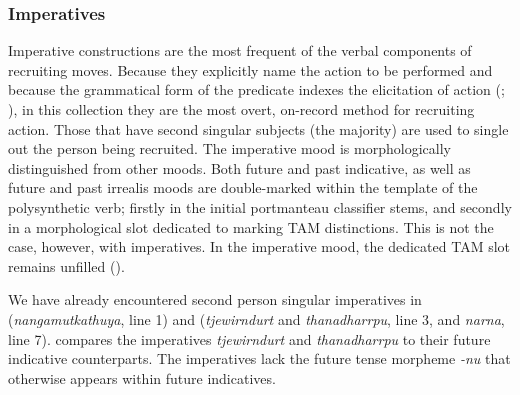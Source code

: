 \documentclass[output=paper,nonflat,colorlinks,citecolor=brown]{langsci/langscibook}
\begin{document}
\subsubsection{Imperatives}\label{sec:blythe:3.3.1}

Imperative constructions are the most frequent of the verbal components of recruiting moves. Because they explicitly name the action to be performed and because the grammatical form of the predicate indexes the elicitation of action (\citealt[774–78]{Lyons1977}; \citealt[170–71]{SadockZwicky1985}), in this collection they are the most overt, on-record method for recruiting action. Those that have second singular subjects (the majority) are used to single out the person being recruited. The imperative mood is morphologically distinguished from other moods. Both future and past indicative, as well as future and past irrealis moods are double-marked within the template of the polysynthetic verb; firstly in the initial portmanteau classifier stems, and secondly in a morphological slot dedicated to marking TAM distinctions. This is not the case, however, with imperatives. In the imperative mood, the dedicated TAM slot remains unfilled (\citealt{Nordlinger2012}).

We have already encountered second person singular imperatives in  (\textit{nangamutkathuya}, line 1) and  (\textit{tjewirndurt} and \textit{thanadharrpu}, line 3, and \textit{narna}, line 7).  compares the imperatives \textit{tjewirndurt} and \textit{thanadharrpu} to their future indicative counterparts. The imperatives lack the future tense morpheme \textit{-nu} that otherwise appears within future indicatives.
\end{document}
